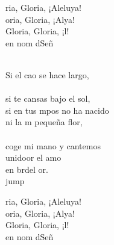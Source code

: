 \begin{cancion}
	\begin{chorus}%
	ria, Gloria, ¡Aleluya!\\
	oria, Gloria, ¡Alya!\\
	Gloria, Gloria, ¡l!\\
	en nom dSeñ \\
	\end{chorus}%
	\jump\\
	Si el cao se hace largo,\\
	\jump\\
si te cansas bajo el sol,\\
	si en tus mpos no ha nacido\\
	ni la m pequeña flor,\\
	\jump\\
coge mi mano y cantemos\\
	unidoor el amo\\
	en brdel or. \\jump\\
	\begin{chorus}%
	ria, Gloria, ¡Aleluya!\\
	oria, Gloria, ¡Alya!\\
	Gloria, Gloria, ¡l!\\
	en nom dSeñ \\
	\end{chorus}%
	\jump\\
\end{cancion}%
